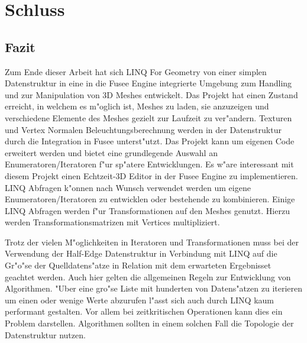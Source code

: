 \documentclass[pagesize, paper=a4, fontsize=12pt,titlepage=true, headings=small, headnosepline, abstractoff, liststotoc, nochapterprefix, plainheadsepline]{scrreprt}
\newcommand{\LFG}{LINQ For Geometry}
\newcommand{\LFGS}{LINQ For Geometry }
\newcommand{\HES}{Half-Edge Datenstruktur }
\begin{document}





\chapter {Schluss}
	\section {Fazit}
		Zum Ende dieser Arbeit hat sich \LFGS von einer simplen Datenstruktur in eine in die Fusee Engine integrierte Umgebung zum Handling und zur Manipulation von 3D Meshes entwickelt. Das Projekt hat einen Zustand erreicht, in welchem es m"oglich ist, Meshes zu laden, sie anzuzeigen und verschiedene Elemente des Meshes gezielt zur Laufzeit zu ver"andern. Texturen und Vertex Normalen Beleuchtungsberechnung werden in der Datenstruktur durch die Integration in Fusee unterst"utzt. Das Projekt kann um eigenen Code erweitert werden und bietet eine grundlegende Auswahl an Enumeratoren/Iteratoren f"ur sp"atere Entwicklungen. Es w"are interessant mit diesem Projekt einen Echtzeit-3D Editor in der Fusee Engine zu implementieren. LINQ Abfragen k"onnen nach Wunsch verwendet werden um eigene Enumeratoren/Iteratoren zu entwicklen oder bestehende zu kombinieren. Einige LINQ Abfragen werden f"ur Transformationen auf den Meshes genutzt. Hierzu werden Transformationsmatrizen mit Vertices multipliziert.

Trotz der vielen M"oglichkeiten in Iteratoren und Transformationen muss bei der Verwendung der \HES in Verbindung mit LINQ auf die Gr"o"se der Quelldatens"atze in Relation mit dem erwarteten Ergebnisset geachtet werden. Auch hier gelten die allgemeinen Regeln zur Entwicklung von Algorithmen. "Uber eine gro"se Liste mit hunderten von Datens"atzen zu iterieren um einen oder wenige Werte abzurufen l"asst sich auch durch LINQ kaum performant gestalten. Vor allem bei zeitkritischen Operationen kann dies ein Problem darstellen. Algorithmen sollten in einem solchen Fall die Topologie der Datenstruktur nutzen.
\end{document}
